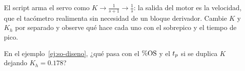 
\begin{modelo}
El script  arma el servo como $K\to\frac{1}{s+1}\to\frac1s$: la salida del motor es la velocidad, que el tacómetro realimenta sin necesidad de un bloque derivador. Cambie $K$ y $K_h$ por separado y observe qué hace cada uno con el sobrepico y el tiempo de pico.
\end{modelo}

\begin{pausa}
En el ejemplo~\ref{ej:so-diseno}, ¿qué pasa con el $\%\mathrm{OS}$ y el $t_p$ si se duplica $K$ dejando $K_h=0.178$?
\end{pausa}
